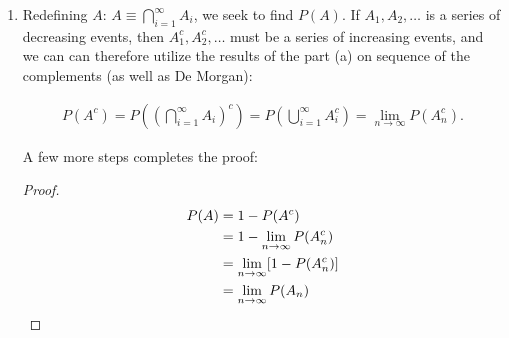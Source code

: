 \begin{problem}{20}
\begin{enumerate}
	\begin{proof}
		\begin{align*}
		P(A) & = P(A_1)+\sum_{i=2}^{\infty} P(A_i-A_{i-1}) \\
		& = P(A_1)+\lim_{n \rightarrow \infty} \sum_{i=2}^{n} P(A_i-A_{i-1}) \\
		& = P(A_1)+\lim_{n \rightarrow \infty} \sum_{i=2}^{n} \left [P(A_i)-P(A_{i-1}) \right] \\
		& =  P(A_1)+\lim_{n \rightarrow \infty} \{ [P(A_2)-P(A_1)]+[P(A_3)-P(A_2)]+[P(A_4)-P(A_3)] \\
		& +\ldots +[P(A_n)-P(A_{n-1})]\} \\
		& = P(A_1)+\lim_{n \rightarrow \infty} [P(A_n)-P(A_1)] \\
		& = \lim_{n \rightarrow \infty} P(A_n) \qedhere
		\end{align*}
	\end{proof}
	
	\item Redefining $A$: $A\equiv \bigcap_{i=1}^{\infty}A_i$, we seek to find $P(A)$. If $A_1, A_2, \ldots$ is a series of decreasing events, then $A_1^c, A_2^c, \ldots$ must be a series of increasing events, and we can can therefore utilize the results of the part (a) on sequence of the complements (as well as De Morgan):
	
	\begin{align*}
		P(A^c) = P\left(\left(\bigcap_{i=1}^{\infty}A_i\right)^c\right)=P\left(\bigcup_{i=1}^{\infty}A_i^c\right) = \lim_{n \rightarrow \infty}P(A_n^c).
	\end{align*}
	
	A few more steps completes the proof:
	
		\begin{proof}
		\begin{align*}
		P(A) & = 1-P(A^c) \\
		& = 1 - \lim_{n \rightarrow \infty}P(A_n^c) \\
		& = \lim_{n \rightarrow \infty} [1 - P(A_n^c)]\\
		 & = \lim_{n \rightarrow \infty} P(A_n) \qedhere
		\end{align*}
	\end{proof}
	
	
\end{enumerate}
	
\end{problem} 

